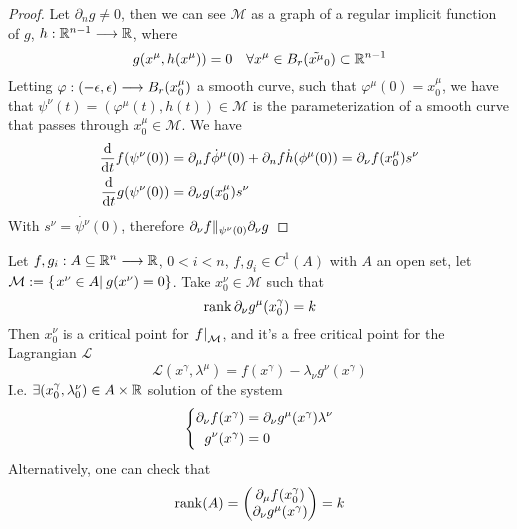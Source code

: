 \documentclass[../complete.tex]{subfiles}
\begin{document}
\begin{proof}
	Let $\partial_ng\ne0$, then we can see $\mathcal{M}$ as a graph of a regular implicit function of $g$, $h:\R^{n-1}\fto\R$, where
	\begin{equation*}
		g(x^\mu,h(x^\mu))=0\quad\forall x^\mu\in B_r(\tilde{x^\mu}_0)\subset\R^{n-1}
	\end{equation*}
	Letting $\varphi:(-\epsilon,\epsilon)\fto B_r(x^\mu_0)$ a smooth curve, such that $\varphi^\mu(0)=x^\mu_0$, we have that $\psi^\nu(t)=(\varphi^\mu(t),h(t))\in\mathcal{M}$ is the parameterization of a smooth curve that passes through $x^\mu_0\in\mathcal{M}$. We have
	\begin{equation*}
		\begin{aligned}
			\derivative{t}f(\psi^\nu(0))&=\del_\mu f\dot{\phi}^\mu(0)+\del_nf\dot{h}(\phi^\mu(0))=\del_\nu f(x^\mu_0)s^\nu\\
			\derivative{t}g(\psi^\nu(0))&=\del_\nu g(x^\mu_0)s^\nu
		\end{aligned}
	\end{equation*}
	With $s^\nu=\dot{\psi^\nu}(0)$, therefore $\del_\nu f\|_{\psi^\nu(0)}\del_\nu g$
\end{proof}
\begin{thm}
	Let $f,g_i:A\subseteq\R^n\fto\R$, $0<i<n$, $f,g_i\in C^1(A)$ with $A$ an open set, let $\mathcal{M}:=\{\derin{x^\nu\in A}g(x^\nu)=0\}$. Take $x^\nu_0\in\mathcal{M}$ such that
	\begin{equation*}
		\rank\del_\nu g^\mu(x^\gamma_0)=k
	\end{equation*}
	Then $x^\nu_0$ is a critical point for $\derin[\mathcal{M}]{f}$, and it's a free critical point for the Lagrangian $\mathcal{L}$
	\begin{equation*}
		\mathcal{L}(x^\gamma,\lambda^\mu)=f(x^\gamma)-\lambda_\nu g^\nu(x^\gamma)
	\end{equation*}
	I.e. $\exists(x^\gamma_0,\lambda^\nu_0)\in A\times\R$ solution of the system
	\begin{equation*}
		\left\{ \begin{aligned}
				\del_\nu f(x^\gamma)&=\del_\nu g^\mu(x^\gamma)\lambda^\nu\\
				g^\nu(x^\gamma)&=0
		\end{aligned}\right.
	\end{equation*}
	Alternatively, one can check that
	\begin{equation*}
		\rank(A)=\begin{pmatrix}\del_\mu f(x^\gamma_0)\\\del_\nu g^\mu(x^\gamma)\end{pmatrix}=k
	\end{equation*}
\end{thm}
\end{document}
